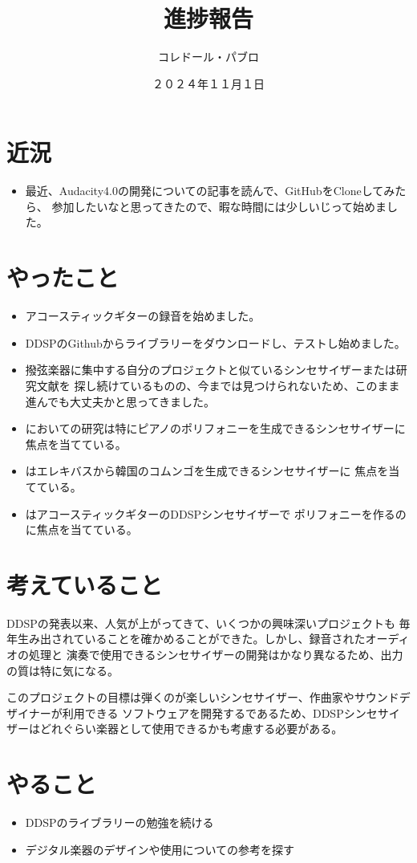 \documentclass[a4paper, 12pt]{article}
\title{進捗報告}
\author{コレドール・パブロ}
\date{２０２４年１１月１日}
\begin{document}
\maketitle

\section*{近況}
\begin{itemize}
    \item 最近、Audacity4.0の開発についての記事を読んで、GitHubをCloneしてみたら、
    参加したいなと思ってきたので、暇な時間には少しいじって始めました。
\end{itemize} 

\section*{やったこと}
\begin{itemize}
    \item アコースティックギターの録音を始めました。
    \item DDSPのGithubからライブラリーをダウンロードし、テストし始めました。 \cite{DDSP}
    \item 撥弦楽器に集中する自分のプロジェクトと似ているシンセサイザーまたは研究文献を
    探し続けているものの、今までは見つけられないため、このまま進んでも大丈夫かと思ってきました。
    \item \cite{DDSP_Piano}においての研究は特にピアノのポリフォニーを生成できるシンセサイザーに
    焦点を当てている。
    \item \cite{DDSP_Traditional}はエレキバスから韓国のコムンゴを生成できるシンセサイザーに
    焦点を当てている。
    \item \cite{DDSP_Guitar_Polyphonic}はアコースティックギターのDDSPシンセサイザーで
    ポリフォニーを作るのに焦点を当てている。
\end{itemize}

\section*{考えていること}

DDSPの発表以来、人気が上がってきて、いくつかの興味深いプロジェクトも
毎年生み出されていることを確かめることができた。しかし、録音されたオーディオの処理と
演奏で使用できるシンセサイザーの開発はかなり異なるため、出力の質は特に気になる。

このプロジェクトの目標は弾くのが楽しいシンセサイザー、作曲家やサウンドデザイナーが利用できる
ソフトウェアを開発するであるため、DDSPシンセサイザーはどれぐらい楽器として使用できるかも考慮する必要がある。

\section*{やること}
\begin{itemize}
    \item DDSPのライブラリーの勉強を続ける
    \item デジタル楽器のデザインや使用についての参考を探す
\end{itemize}



\end{document}
